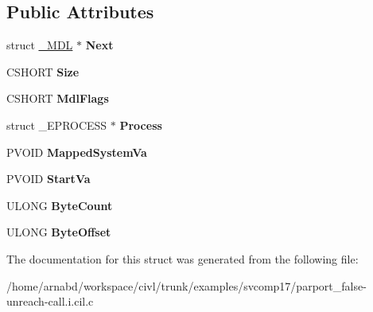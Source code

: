 \subsection*{Public Attributes}
\begin{DoxyCompactItemize}
\item 
\hypertarget{struct__MDL_ad93287f7cfacf15355174410a72522f9}{}struct \hyperlink{struct__MDL}{\+\_\+\+M\+D\+L} $\ast$ {\bfseries Next}\label{struct__MDL_ad93287f7cfacf15355174410a72522f9}

\item 
\hypertarget{struct__MDL_a890c884de0c8e350259e5da0722c0e3f}{}C\+S\+H\+O\+R\+T {\bfseries Size}\label{struct__MDL_a890c884de0c8e350259e5da0722c0e3f}

\item 
\hypertarget{struct__MDL_adbde0d7549e734ef9873be713be87b4e}{}C\+S\+H\+O\+R\+T {\bfseries Mdl\+Flags}\label{struct__MDL_adbde0d7549e734ef9873be713be87b4e}

\item 
\hypertarget{struct__MDL_a1e588a0e01a482159ef001aed0f11040}{}struct \+\_\+\+E\+P\+R\+O\+C\+E\+S\+S $\ast$ {\bfseries Process}\label{struct__MDL_a1e588a0e01a482159ef001aed0f11040}

\item 
\hypertarget{struct__MDL_acd2c5133405447474c16c7a53bfe9177}{}P\+V\+O\+I\+D {\bfseries Mapped\+System\+Va}\label{struct__MDL_acd2c5133405447474c16c7a53bfe9177}

\item 
\hypertarget{struct__MDL_acd132673c7646b0ad818311040ea0ada}{}P\+V\+O\+I\+D {\bfseries Start\+Va}\label{struct__MDL_acd132673c7646b0ad818311040ea0ada}

\item 
\hypertarget{struct__MDL_a19ddc156511f9e7760539fc56a3199bb}{}U\+L\+O\+N\+G {\bfseries Byte\+Count}\label{struct__MDL_a19ddc156511f9e7760539fc56a3199bb}

\item 
\hypertarget{struct__MDL_a264978adb0a66b84f9aab2b9d126ecf4}{}U\+L\+O\+N\+G {\bfseries Byte\+Offset}\label{struct__MDL_a264978adb0a66b84f9aab2b9d126ecf4}

\end{DoxyCompactItemize}


The documentation for this struct was generated from the following file\+:\begin{DoxyCompactItemize}
\item 
/home/arnabd/workspace/civl/trunk/examples/svcomp17/parport\+\_\+false-\/unreach-\/call.\+i.\+cil.\+c\end{DoxyCompactItemize}
